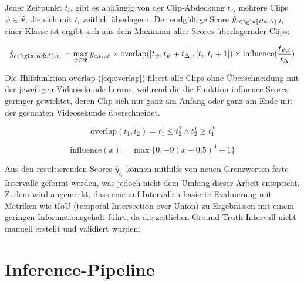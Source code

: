 Jeder Zeitpunkt $t_i$, gibt es abhängig von der Clip-Abdeckung $t_\Delta$ mehrere Clips $\psi \in \Psi$, die sich mit $t_i$ zeitlich überlagern.
Der endgültige Score $\hat{y}_{c \in \gls{tld:A}, t_i}$ einer Klasse ist ergibt sich aus dem Maximum aller Scores überlagernder Clips:

\begin{equation}
    \label{eq:detection}
    \hat{y}_{c \in \gls{tld:A}, t_i} =  \max\limits_{ \psi \in \Psi } y_{c, t_i, \psi} \times \text{overlap}([t_\psi, t_\psi + t_\Delta ], [t_i, t_i + 1]) \times \text{influence}(\frac{t_{\psi, i}}{t_\Delta})
\end{equation}

Die Hilfsfunktion $\text{overlap}$ (\autoref{eq:overlap}) filtert alle Clips ohne Überschneidung mit der jeweiligen Videosekunde heraus, während die die Funktion $\text{influence}$ Scores geringer gewichtet, deren Clip sich nur ganz am Anfang oder ganz am Ende mit der gesuchten Videosekunde überschneidet.

\begin{equation}
    \label{eq:overlap}
    \text{overlap}(t_1, t_2) = t_1^1 \leq t_2^2 \land t_2^1 \geq t_1^2
\end{equation}

\begin{equation}
    \label{eq:influence}
    \text{influence}(x) =  \max \{0, -9{(x-0.5)}^4 + 1\}
\end{equation}

Aus den resultierenden Scores  $\hat{y}_{t_i}$ können mithilfe von neuen Grenzwerten feste Intervalle geformt werden, was jedoch nicht dem Umfang dieser Arbeit entspricht.
Zudem wird angemerkt, dass eine auf Intervallen basierte Evaluierung mit Metriken wie tIoU (temporal Intersection over Union) zu Ergebnissen mit einem geringen Informationsgehalt führt, da die zeitlichen Ground-Truth-Intervall nicht manuell erstellt und validiert wurden.


\section{Inference-Pipeline}
\label{sec:inference-pipeline}

